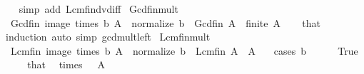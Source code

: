 \begin{isabellebody}
%
\isadelimproof
\ \ %
\endisadelimproof
%
\isatagproof
{}\isamarkupfalse%
\ {\isacharparenleft}{\kern0pt}simp\ add{\isacharcolon}{\kern0pt}\ Lcm{\isacharunderscore}{\kern0pt}fin{\isacharunderscore}{\kern0pt}dvd{\isacharunderscore}{\kern0pt}iff{\isacharparenright}{\kern0pt}%
\endisatagproof
{\isafoldproof}%
%
\isadelimproof
\isanewline
%
\endisadelimproof
\isanewline
{}\isamarkupfalse%
\ Gcd{\isacharunderscore}{\kern0pt}fin{\isacharunderscore}{\kern0pt}mult{\isacharcolon}{\kern0pt}\isanewline
\ \ {\isachardoublequoteopen}Gcd\isactrlsub f\isactrlsub i\isactrlsub n\ {\isacharparenleft}{\kern0pt}image\ {\isacharparenleft}{\kern0pt}times\ b{\isacharparenright}{\kern0pt}\ A{\isacharparenright}{\kern0pt}\ {\isacharequal}{\kern0pt}\ normalize\ {\isacharparenleft}{\kern0pt}b\ {\isacharasterisk}{\kern0pt}\ Gcd\isactrlsub f\isactrlsub i\isactrlsub n\ A{\isacharparenright}{\kern0pt}{\isachardoublequoteclose}\ \ {\isachardoublequoteopen}finite\ A{\isachardoublequoteclose}\isanewline
%
\isadelimproof
\ \ %
\endisadelimproof
%
\isatagproof
{}\isamarkupfalse%
\ that\ \isamarkupfalse%
\ induction\ {\isacharparenleft}{\kern0pt}auto\ simp{\isacharcolon}{\kern0pt}\ gcd{\isacharunderscore}{\kern0pt}mult{\isacharunderscore}{\kern0pt}left{\isacharparenright}{\kern0pt}%
\endisatagproof
{\isafoldproof}%
%
\isadelimproof
\isanewline
%
\endisadelimproof
\isanewline
{}\isamarkupfalse%
\ Lcm{\isacharunderscore}{\kern0pt}fin{\isacharunderscore}{\kern0pt}mult{\isacharcolon}{\kern0pt}\isanewline
\ \ {\isachardoublequoteopen}Lcm\isactrlsub f\isactrlsub i\isactrlsub n\ {\isacharparenleft}{\kern0pt}image\ {\isacharparenleft}{\kern0pt}times\ b{\isacharparenright}{\kern0pt}\ A{\isacharparenright}{\kern0pt}\ {\isacharequal}{\kern0pt}\ normalize\ {\isacharparenleft}{\kern0pt}b\ {\isacharasterisk}{\kern0pt}\ Lcm\isactrlsub f\isactrlsub i\isactrlsub n\ A{\isacharparenright}{\kern0pt}{\isachardoublequoteclose}\ \ {\isachardoublequoteopen}A\ {\isasymnoteq}\ {\isacharbraceleft}{\kern0pt}{\isacharbraceright}{\kern0pt}{\isachardoublequoteclose}\isanewline
%
\isadelimproof
%
\endisadelimproof
%
\isatagproof
{}\isamarkupfalse%
\ {\isacharparenleft}{\kern0pt}cases\ {\isachardoublequoteopen}b\ {\isacharequal}{\kern0pt}\ {}{\isachardoublequoteclose}{\isacharparenright}{\kern0pt}\isanewline
\ \ \isamarkupfalse%
\ True\isanewline
\ \ \isamarkupfalse%
\ \isamarkupfalse%
\ that\ \isamarkupfalse%
\ {\isachardoublequoteopen}times\ {}\ {\isacharbackquote}{\kern0pt}\ A\ {\isacharequal}{\kern0pt}\ {\isacharbraceleft}{\kern0pt}{}{\isacharbraceright}{\kern0pt}{\isachardoublequoteclose}\isanewline

\end{isabellebody}
